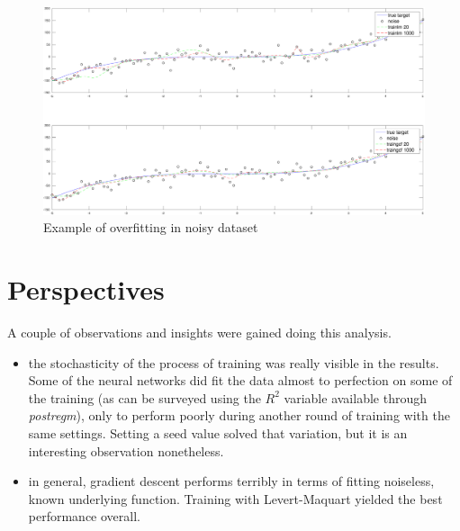 \documentclass[11pt, a4paper]{article}
\begin{document}
\begin{figure}[H]
  \includegraphics[scale=.43]{trainnoise.pdf}
  \caption{Example of overfitting in noisy dataset}  
  \label{fig:trainnoise}
\end{figure}

\section{Perspectives}

A couple of observations and insights were gained doing this analysis. 

\begin{itemize}
\item the stochasticity of the process of training was really visible
  in the results. Some of the neural networks did fit the data almost
  to perfection on some of the training (as can be surveyed using the
  $R^2$ variable available through \emph{postregm}), only to perform
  poorly during another round of training with the same
  settings. Setting a seed value solved that variation, but it is an
  interesting observation nonetheless.
\item in general, gradient descent performs terribly in terms of
  fitting noiseless, known underlying function. Training with
  Levert-Maquart yielded the best performance overall.
\end{itemize}

 

\end{document}
